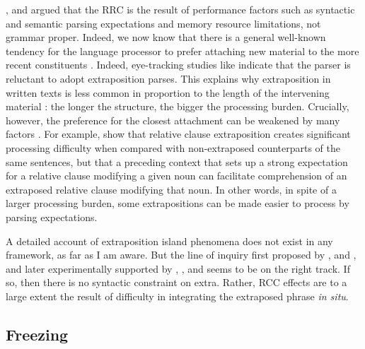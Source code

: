 \documentclass[output=paper
 	        ,biblatex
                ,babelshorthands
                ,newtxmath
                ,draftmode
                ,colorlinks, citecolor=brown
]{langscibook}
\begin{document}


\zl


 \citet{grosurrc},  \citet{gazdar} and \citet{stucky} argued that the RRC is the result of
  performance  factors such as  syntactic and semantic parsing expectations and  memory resource  limitations,  not grammar proper.   Indeed, we now know that  there is a general well-known  tendency for the language processor to  prefer attaching new material
 to the more recent constituents  \citep{frazcl,gibetal,trax98,fodor02b,fernandez03}. 
Indeed, eye-tracking studies like \citet{hnps}  indicate that the
parser is reluctant to adopt  extraposition  parses.
This  explains why     extraposition in written texts
is less common in proportion to the length of  the  intervening material \citep{UBDKKOS98b}:
the longer the structure, the bigger the processing burden. 
 Crucially, however, the preference for the closest attachment can be weakened by
many factors \citep{fernandez03,desmet,devic,carreras}. 
For example,  \citet{levyted}  show that relative clause extraposition creates
 significant processing difficulty when compared with  non-extraposed counterparts of 
 the same sentences,   but that a preceding context that sets up a strong expectation
for a relative clause modifying a given noun can  facilitate
comprehension of an extraposed relative clause modifying that noun.
In other words, in spite of a larger processing burden,
some extrapositions can be made easier to process by parsing expectations.

A detailed account of extraposition island phenomena  does not exist in any framework, as far as I
am aware. But the line of inquiry first proposed by  \citet{grosurrc},  \citet{gazdar} and \citet{stucky},  and later experimentally supported by \citet{levyted}, \citet{SS2009a-u}, and \citet{strunk} seems to be on the right track. If so, then there is no syntactic constraint on {\sc extra}. Rather, RCC effects are to a large extent the result of difficulty in integrating the extraposed phrase \emph{in situ}.  

\subsection{Freezing}
\end{document}
